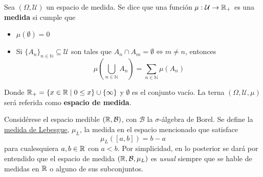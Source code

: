\begin{definicion}%
Sea $(\Omega, \mathcal{U})$ un espacio de medida. Se dice que una función $\mu : \mathcal{U} \rightarrow \mathbb{R}_+$ es una \textbf{medida} si cumple que
\begin{itemize}
\item $\mu(\emptyset) = 0$
\item Si $\{ A_n \}_{n\in \mathbb{N}} \subseteq \mathcal{U}$ son tales que $A_n \cap A_m = \emptyset \Leftrightarrow m\neq n$, entonces 
\begin{equation}
\mu\left( \bigcup_{n\in \mathbb{N}} A_n \right) = \sum_{n\in \mathbb{N}} \mu(A_n)
\end{equation}
\end{itemize}
Donde $\mathbb{R}_+ = \left\{ x\in \mathbb{R} \mathrel{}\middle|\mathrel{} 0 \leq x \right\} \cup \{ \infty \}$ y $\emptyset$ es el conjunto vacío. La terna $(\Omega,\mathcal{U},\mu)$ será referida como \textbf{espacio de medida}.
\label{medida}
\end{definicion}


\begin{ejemplo}
Considérese el espacio medible $(\mathbb{R}, \mathcal{B})$, con $\mathcal{B}$ la $\sigma$-álgebra de Borel. Se define la \ul{medida de Lebesgue}, $\mu_L$, la medida en el espacio mencionado que satisface 
\begin{equation}
\mu_L([a,b]) = b-a
\end{equation}
para cualesquiera $a,b \in \mathbb{R}$ con $a<b$. Por simplicidad, en lo posterior se dará por entendido que el espacio de medida $(\mathbb{R}, \mathcal{B},\mu_L)$ es \textit{usual} siempre que se hable de medidas en $\mathbb{R}$ o alguno de sus subconjuntos.
\end{ejemplo}


